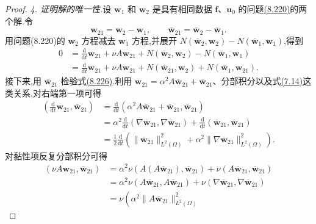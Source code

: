 \begin{theorem}[周期边界情形下解的存在唯一性]
\begin{proof}
\emph{4. 证明解的唯一性.}设 $\bm{w}_1$ 和 $\bm{w}_2$ 是具有相同数据 $\bm{f}$、$\bm{u}_0$ 的问题\hyperref[eq:navier-stokes-alpha-operator-form]{(8.220)}的两个解.令
\[
 \bm{w}_{21}=\bm{w}_2-\bm{w}_1,
 \qquad
 \overline{\bm{w}}_{21}
  =\overline{\bm{w}}_2-\overline{\bm{w}}_1.
\]
用问题(8.220)的 $\bm{w}_2$ 方程减去 $\bm{w}_1$ 方程,并展开
$N(\overline{\bm{w}}_2,\bm{w}_2)-N(\overline{\bm{w}}_1,\bm{w}_1)$,得到
\begin{equation}\label{eq:navier-stokes-alpha-uniqueness-difference}
\begin{aligned}
 0&=\frac{\mathrm{d}}{\mathrm{d}t}\bm{w}_{21}
    +\nu A\bm{w}_{21}
    +N(\overline{\bm{w}}_2,\bm{w}_2)
    -N(\overline{\bm{w}}_1,\bm{w}_1)\\
  &=\frac{\mathrm{d}}{\mathrm{d}t}\bm{w}_{21}
    +\nu A\bm{w}_{21}
    +N(\overline{\bm{w}}_{21},\bm{w}_2)
    +N(\overline{\bm{w}}_1,\bm{w}_{21}).
\end{aligned}
\end{equation}
接下来,用 $\overline{\bm{w}}_{21}$ 检验式\hyperref[eq:navier-stokes-alpha-uniqueness-difference]{(8.226)}.利用 $\bm{w}_{21}=\alpha^2A\overline{\bm{w}}_{21}+\overline{\bm{w}}_{21}$、分部积分以及式\hyperref[eq:time-dependent-galerkin-energy-step]{(7.14)}这类关系,对右端第一项可得
\[
\begin{aligned}
 \left(\frac{\mathrm{d}}{\mathrm{d}t}\bm{w}_{21},
        \overline{\bm{w}}_{21}\right)
 &=\frac{\mathrm{d}}{\mathrm{d}t}
   \left(\alpha^2A\overline{\bm{w}}_{21}
         +\overline{\bm{w}}_{21},\overline{\bm{w}}_{21}\right)\\
 &=\alpha^2\frac{\mathrm{d}}{\mathrm{d}t}
    (\nabla\overline{\bm{w}}_{21},
     \nabla\overline{\bm{w}}_{21})
   +\frac{\mathrm{d}}{\mathrm{d}t}
     (\overline{\bm{w}}_{21},\overline{\bm{w}}_{21})\\
 &=\frac12\frac{\mathrm{d}}{\mathrm{d}t}
   \left(\|\overline{\bm{w}}_{21}\|_{L^2(\Omega)}^2
        +\alpha^2\|\nabla\overline{\bm{w}}_{21}\|_{L^2(\Omega)}^2\right).
\end{aligned}
\]
对黏性项反复分部积分可得
\[
\begin{aligned}
 (\nu A\bm{w}_{21},\overline{\bm{w}}_{21})
 &=\alpha^2\nu(A(A\overline{\bm{w}}_{21}),
                    \overline{\bm{w}}_{21})
   +\nu(A\overline{\bm{w}}_{21},\overline{\bm{w}}_{21})\\
 &=\alpha^2\nu(A\overline{\bm{w}}_{21},A\overline{\bm{w}}_{21})
   +\nu(\nabla\overline{\bm{w}}_{21},
        \nabla\overline{\bm{w}}_{21})\\
 &=\nu\left(\alpha^2\|A\overline{\bm{w}}_{21}\|_{L^2(\Omega)}^2

\end{aligned}\]
\end{proof}
\end{theorem}
